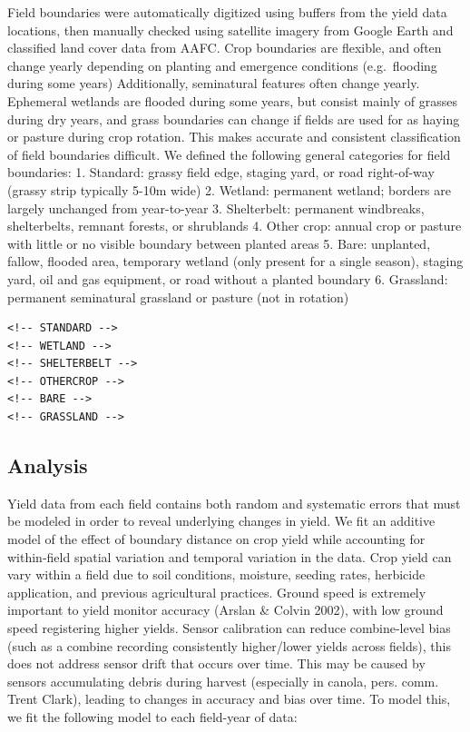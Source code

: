 \documentclass[]{elsarticle} %
\begin{document}
Field boundaries were automatically digitized using buffers from the yield data locations, then manually checked using satellite imagery from Google Earth and classified land cover data from AAFC.
Crop boundaries are flexible, and often change yearly depending on planting and emergence conditions (e.g.~flooding during some years)
Additionally, seminatural features often change yearly.
Ephemeral wetlands are flooded during some years, but consist mainly of grasses during dry years, and grass boundaries can change if fields are used for as haying or pasture during crop rotation.
This makes accurate and consistent classification of field boundaries difficult.
We defined the following general categories for field boundaries:
1. Standard: grassy field edge, staging yard, or road right-of-way (grassy strip typically 5-10m wide)
2. Wetland: permanent wetland; borders are largely unchanged from year-to-year
3. Shelterbelt: permanent windbreaks, shelterbelts, remnant forests, or shrublands
4. Other crop: annual crop or pasture with little or no visible boundary between planted areas
5. Bare: unplanted, fallow, flooded area, temporary wetland (only present for a single season), staging yard, oil and gas equipment, or road without a planted boundary
6. Grassland: permanent seminatural grassland or pasture (not in rotation)

\begin{verbatim}
<!-- STANDARD -->
<!-- WETLAND -->
<!-- SHELTERBELT -->
<!-- OTHERCROP -->
<!-- BARE -->
<!-- GRASSLAND -->
\end{verbatim}

\hypertarget{analysis}{%
\subsection{Analysis}\label{analysis}}

Yield data from each field contains both random and systematic errors that must be modeled in order to reveal underlying changes in yield.
We fit an additive model of the effect of boundary distance on crop yield while accounting for within-field spatial variation and temporal variation in the data.
Crop yield can vary within a field due to soil conditions, moisture, seeding rates, herbicide application, and previous agricultural practices.
Ground speed is extremely important to yield monitor accuracy (Arslan \& Colvin 2002), with low ground speed registering higher yields.
Sensor calibration can reduce combine-level bias (such as a combine recording consistently higher/lower yields across fields), this does not address sensor drift that occurs over time.
This may be caused by sensors accumulating debris during harvest (especially in canola, pers. comm. Trent Clark), leading to changes in accuracy and bias over time.
To model this, we fit the following model to each field-year of data:
\end{document}
